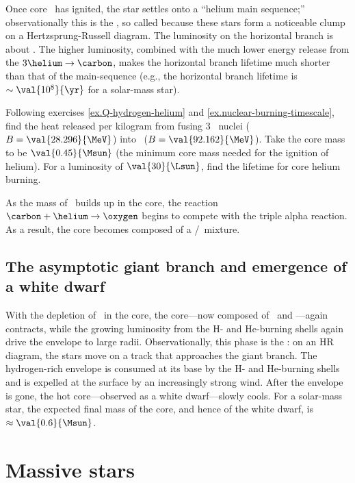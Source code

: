 Once core \helium\ has ignited, the star settles onto a ``helium main sequence;'' observationally this is the , so called because these stars form a noticeable clump on a Hertzsprung-Russell diagram. The luminosity on the horizontal branch is about . The higher luminosity, combined with the much lower energy release from the $3\helium\to\carbon$, makes the horizontal branch lifetime much shorter than that of the main-sequence (e.g., the horizontal branch lifetime is $\sim \val{10^{8}}{\yr}$ for a solar-mass star).

\begin{exercisebox}
Following exercises \ref{ex.Q-hydrogen-helium} and \ref{ex.nuclear-burning-timescale}, find the heat released per kilogram from fusing 3 \helium\ nuclei ($B=\val{28.296}{\MeV}$) into \carbon\ ($B=\val{92.162}{\MeV}$). Take the core mass to be $\val{0.45}{\Msun}$ (the minimum core mass needed for the ignition of helium). For a luminosity of $\val{30}{\Lsun}$, find the lifetime for core helium burning.
\end{exercisebox}

As the mass of \carbon\ builds up in the core, the reaction $\carbon+\helium\to\oxygen$ begins to compete with the triple alpha reaction. As a result, the core becomes composed of a \carbon/\oxygen\ mixture.

\subsection{The asymptotic giant branch and emergence of a white dwarf}

With the depletion of \helium\ in the core, the core---now composed of \carbon\ and \oxygen---again contracts, while the growing luminosity from the H- and He-burning shells again drive the envelope to large radii. Observationally, this phase is the : on an HR diagram, the stars move on a track that approaches the giant branch. The hydrogen-rich envelope is consumed at its base by the H- and He-burning shells and is expelled at the surface by an increasingly strong wind. After the envelope is gone, the hot core---observed as a white dwarf---slowly cools. For a solar-mass star, the expected final mass of the core, and hence of the white dwarf, is $\approx\val{0.6}{\Msun}$.

\section{Massive stars}

